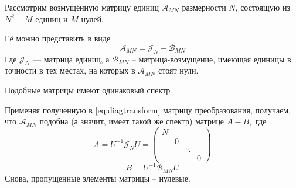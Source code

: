 Рассмотрим возмущённую матрицу единиц
\( \mathscr{A}_{MN} \) размерности \( N \),
состоящую из \( N^2 - M \) единиц и \( M \) нулей.

Её можно представить в виде
\[
    \mathscr{A}_{MN} = \mathscr{J}_{N} - \mathscr{B}_{MN}
    \]
Где \( \mathscr{J}_{N} \) --- матрица единиц,
а \( \mathscr{B}_{MN} \) -- матрица-возмущение,
имеющая единицы в точности в тех местах,
на которых в \( \mathscr{A}_{MN} \) стоят нули.

\begin{prop}
    Подобные матрицы имеют одинаковый спектр
\end{prop}

Применяя полученную в \eqref{eq:diagtransform} матрицу преобразования,
получаем, что \( \mathscr{A}_{MN} \) подобна (а значит, имеет такой же спектр)
матрице
\( A - B, \)
где
\[
    A = {U^{-1}}{\mathscr{J}_{N}}{U}
    = \begin{pmatrix}
      N &   &        & \\
        & 0 &        & \\
        &   & \ddots & \\
        &   &        & 0
        \end{pmatrix}
        \]
\[
    B = {U^{-1}}{\mathscr{B}_{MN}}{U}
    \]
Снова, пропущенные элементы матрицы -- нулевые.
